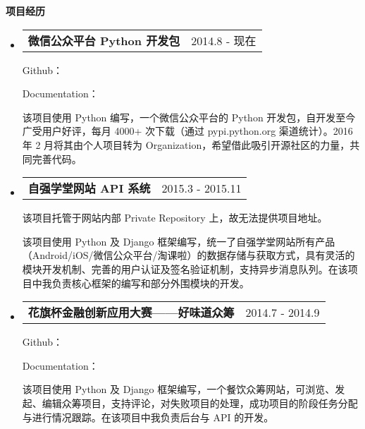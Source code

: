 \documentclass[a4paper,9pt]{article}
\makeatletter
\newcommand{\resheading}[1]{{\large \colorbox{mygrey}{\begin{minipage}{\textwidth}{\textbf{#1 \vphantom{p\^{E}}}}\end{minipage}}}}
\newcommand{\ressubheading}[2]{
  \begin{tabular*}{172mm}{l@{\extracolsep{\fill}}r}
    \textbf{#1} & #2
  \end{tabular*}\vspace{0pt}}
\makeatother
\begin{document}
\resheading{项目经历}

\begin{itemize}
\item

  \ressubheading{微信公众平台 Python 开发包}{2014.8 - 现在}

  \begin{adjustwidth}{8mm}{8mm}

  \textnormal{Github：\color{link}{https://github.com/wechat-python-sdk/} }

  \textnormal{Documentation：\color{link}{http://wechat-python-sdk.com/}}

  \textnormal{该项目使用 Python 编写，一个微信公众平台的 Python 开发包，自开发至今广受用户好评，每月 4000+ 次下载（通过 pypi.python.org 渠道统计）。2016 年 2 月将其由个人项目转为 Organization，希望借此吸引开源社区的力量，共同完善代码。}

  \end{adjustwidth}

\end{itemize}

\begin{itemize}
\item
  \ressubheading{自强学堂网站 API 系统}{2015.3 - 2015.11}

  \begin{adjustwidth}{8mm}{8mm}

  \textnormal{该项目托管于网站内部 Private Repository 上，故无法提供项目地址。}

  \textnormal{该项目使用 Python 及 Django 框架编写，统一了自强学堂网站所有产品（Android/iOS/微信公众平台/淘课啦）的数据存储与获取方式，具有灵活的模块开发机制、完善的用户认证及签名验证机制，支持异步消息队列。在该项目中我负责核心框架的编写和部分外围模块的开发。}

  \end{adjustwidth}
\end{itemize}

\begin{itemize}
\item
  \ressubheading{花旗杯金融创新应用大赛——好味道众筹}{2014.7 - 2014.9}

  \begin{adjustwidth}{8mm}{8mm}

  \textnormal{Github：\color{link}{https://github.com/doraemonext/citi/}}

  \textnormal{Documentation：\color{link}{http://docs.citi.apiary.io/}}

  \textnormal{该项目使用 Python 及 Django 框架编写，一个餐饮众筹网站，可浏览、发起、编辑众筹项目，支持评论，对失败项目的处理，成功项目的阶段任务分配与进行情况跟踪。在该项目中我负责后台与 API 的开发。}

  \end{adjustwidth}
\end{itemize}
\end{document}
